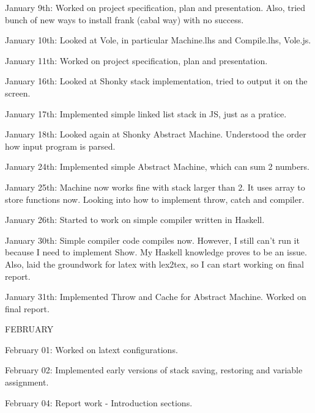 \documentclass[12pt]{report}
\begin{document}
January 9th: Worked on project specification, plan and presentation. Also, tried
bunch of new ways to install frank (cabal way) with no success.

January 10th: Looked at Vole, in particular Machine.lhs and Compile.lhs, Vole.js.

January 11th: Worked on project specification, plan and presentation.

January 16th: Looked at Shonky stack implementation, tried to output it
on the screen.

January 17th: Implemented simple linked list stack in JS, just as a pratice.

January 18th: Looked again at Shonky Abstract Machine. Understood the order how
input program is parsed.

January 24th: Implemented simple Abstract Machine, which can sum 2 numbers.

January 25th: Machine now works fine with stack larger than 2. It uses array to
store functions now. Looking into how to implement throw, catch and compiler.

January 26th: Started to work on simple compiler written in Haskell.

January 30th: Simple compiler code compiles now. However, I still can't run it
because I need to implement Show. My Haskell knowledge proves to be an issue.
Also, laid the groundwork for latex with lex2tex, so I can start working on final
report.

January 31th: Implemented Throw and Cache for Abstract Machine. Worked on final
report. 

FEBRUARY 

February 01: Worked on latext configurations.

February 02: Implemented early versions of stack saving, restoring and variable
assignment.

February 04: Report work - Introduction sections. 
\end{document}
